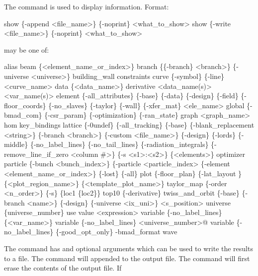 {{The  command is used to display information.
Format:
\begin{example}
  show \{-append <file_name>\} \{-noprint\} <what_to_show>
  show \{-write <file_name>\} \{-noprint\} <what_to_show>
\end{example}

 may be one of:
\begin{example}
   alias
   beam \{<element_name_or_index>\}
   branch \{\{-branch\} <branch>\} \{-universe <universe>\} 
   building_wall  
   constraints
   curve \{-symbol\} \{-line\} <curve_name> 
   data \{<data_name>\} 
   derivative <data_name(s)> <var_name(s)>
   element \{-all_attributes\} \{-base\} \{-data\} \{-design\} \{-field\} 
         \{-floor_coords\} \{-no_slaves\} \{-taylor\} \{-wall\} \{-xfer_mat\} <ele_name>
   global \{-bmad_com\} \{-csr_param\} \{-optimization\} \{-ran_state\} 
   graph <graph_name>
   hom
   key_bindings
   lattice \{-0undef\} \{-all_tracking\} \{-base\} \{-blank_replacement <string>\} 
         \{-branch <branch>\} \{-custom <file_name>\} \{-design\} \{-lords\} \{-middle\} 
         \{-no_label_lines\} \{-no_tail_lines\} \{-radiation_integrals\}
         \{-remove_line_if_zero <column \#>\} \{-s <s1>:<s2>\} \{<elements>\} 
   optimizer
   particle \{-bunch <bunch_index>\} \{-particle <particle_index> 
         \{-element <element_name_or_index>\} \{-lost\} \{-all\}
   plot \{-floor_plan\} \{-lat_layout \} \{<plot_region_name>\} \{<template_plot_name>\} 
   taylor_map \{-order <n_order>\} \{-s\} \{loc1 \{loc2\}\}
   top10 \{-derivative\}
   twiss_and_orbit \{-base\} \{-branch <name>\} \{-design\} \{-universe <ix_uni>\} <s_position>
   universe \{universe_number\}
   use
   value <expression>
   variable \{-no_label_lines\} \{<var_name>\}
   variable \{-no_label_lines\} <universe_number>@
   variable \{-no_label_lines\} \{-good_opt_only\} -bmad_format
   wave
\end{example}

\vskip 0.2in 

The  command has  and 
optional arguments which can be used to write the results to a file.
The  command will appended to the output file. The
 command will first erase the contents of the output
file. If \vn{global%
digit number is substituted for the \vn{*}. The value of the number
starts at \vn{001} and increases by 1 each time \vn{show -write} is
used.  Example:
\begin{example}
  show -write orb.dat orbit    ! Write orbit data to the file "orb.dat".
\end{example}

}}}
